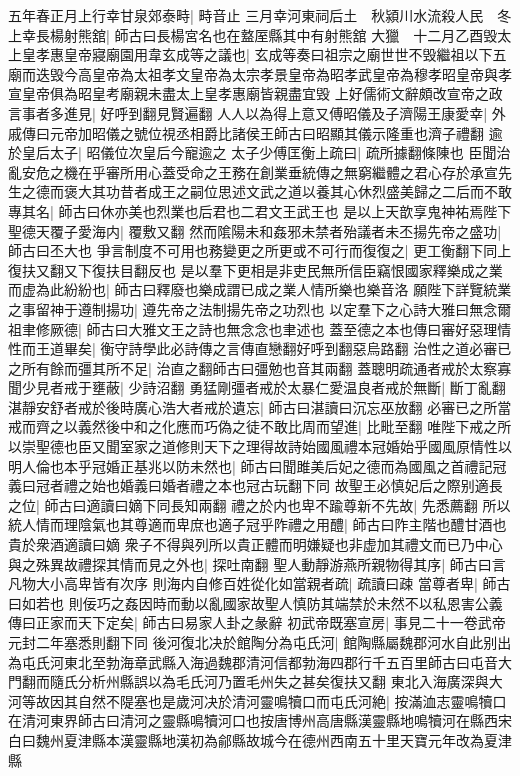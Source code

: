 五年春正月上行幸甘泉郊泰畤|{
	畤音止}
三月幸河東祠后土　秋潁川水流殺人民　冬上幸長楊射熊舘|{
	師古曰長楊宮名也在盩厔縣其中有射熊舘}
大獵　十二月乙酉毁太上皇孝惠皇帝寢廟園用韋玄成等之議也|{
	玄成等奏曰祖宗之廟世世不毁繼祖以下五廟而迭毁今高皇帝為太祖孝文皇帝為太宗孝景皇帝為昭孝武皇帝為穆孝昭皇帝與孝宣皇帝俱為昭皇考廟親未盡太上皇孝惠廟皆親盡宜毁}
上好儒術文辭頗改宣帝之政言事者多進見|{
	好呼到翻見賢遍翻}
人人以為得上意又傅昭儀及子濟陽王康愛幸|{
	外戚傳曰元帝加昭儀之號位視丞相爵比諸侯王師古曰昭顯其儀示隆重也濟子禮翻}
逾於皇后太子|{
	昭儀位次皇后今寵逾之}
太子少傅匡衡上疏曰|{
	疏所據翻條陳也}
臣聞治亂安危之機在乎審所用心蓋受命之王務在創業垂統傳之無窮繼體之君心存於承宣先生之德而褒大其功昔者成王之嗣位思述文武之道以養其心休烈盛美歸之二后而不敢專其名|{
	師古曰休亦美也烈業也后君也二君文王武王也}
是以上天歆享鬼神祐焉陛下聖德天覆子愛海内|{
	覆敷又翻}
然而隂陽未和姦邪未禁者殆議者未丕揚先帝之盛功|{
	師古曰丕大也}
爭言制度不可用也務變更之所更或不可行而復復之|{
	更工衡翻下同上復扶又翻又下復扶目翻反也}
是以羣下更相是非吏民無所信臣竊恨國家釋樂成之業而虚為此紛紛也|{
	師古曰釋廢也樂成謂已成之業人情所樂也樂音洛}
願陛下詳覽統業之事留神于遵制揚功|{
	遵先帝之法制揚先帝之功烈也}
以定羣下之心詩大雅曰無念爾祖聿修厥德|{
	師古曰大雅文王之詩也無念念也聿述也}
蓋至德之本也傳曰審好惡理情性而王道畢矣|{
	衡守詩學此必詩傳之言傳直戀翻好呼到翻惡烏路翻}
治性之道必審已之所有餘而彊其所不足|{
	治直之翻師古曰彊勉也音其兩翻}
蓋聰明疏通者戒於太察寡聞少見者戒于壅蔽|{
	少詩沼翻}
勇猛剛彊者戒於太暴仁愛温良者戒於無斷|{
	斷丁亂翻}
湛靜安舒者戒於後時廣心浩大者戒於遺忘|{
	師古曰湛讀曰沉忘巫放翻}
必審已之所當戒而齊之以義然後中和之化應而巧偽之徒不敢比周而望進|{
	比毗至翻}
唯陛下戒之所以崇聖德也臣又聞室家之道修則天下之理得故詩始國風禮本冠婚始乎國風原情性以明人倫也本乎冠婚正基兆以防未然也|{
	師古曰聞雎美后妃之德而為國風之首禮記冠義曰冠者禮之始也婚義曰婚者禮之本也冠古玩翻下同}
故聖王必慎妃后之際别適長之位|{
	師古曰適讀曰嫡下同長知兩翻}
禮之於内也卑不踰尊新不先故|{
	先悉薦翻}
所以統人情而理陰氣也其尊適而卑庶也適子冠乎阼禮之用醴|{
	師古曰阼主階也醴甘酒也貴於衆酒適讀曰嫡}
衆子不得與列所以貴正體而明嫌疑也非虚加其禮文而已乃中心與之殊異故禮探其情而見之外也|{
	探吐南翻}
聖人動靜游燕所親物得其序|{
	師古曰言凡物大小高卑皆有次序}
則海内自修百姓從化如當親者疏|{
	疏讀曰疎}
當尊者卑|{
	師古曰如若也}
則佞巧之姦因時而動以亂國家故聖人慎防其端禁於未然不以私恩害公義傳曰正家而天下定矣|{
	師古曰易家人卦之彖辭}
初武帝既塞宣房|{
	事見二十一卷武帝元封二年塞悉則翻下同}
後河復北决於館陶分為屯氏河|{
	館陶縣屬魏郡河水自此别出為屯氏河東北至勃海章武縣入海過魏郡清河信都勃海四郡行千五百里師古曰屯音大門翻而隨氏分析州縣誤以為毛氏河乃置毛州失之甚矣復扶又翻}
東北入海廣深與大河等故因其自然不隄塞也是歲河决於清河靈鳴犢口而屯氏河絶|{
	按滿洫志靈鳴犢口在清河東界師古曰清河之靈縣鳴犢河口也按唐博州高唐縣漢靈縣地鳴犢河在縣西宋白曰魏州夏津縣本漢靈縣地漢初為鄃縣故城今在德州西南五十里天寶元年改為夏津縣}


